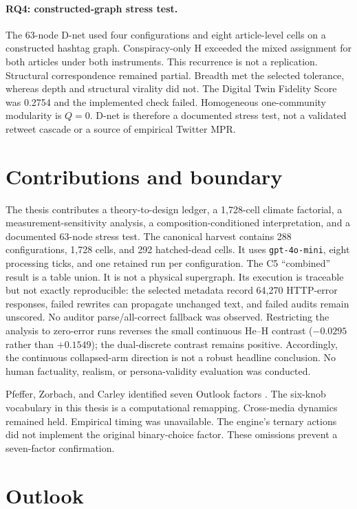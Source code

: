 \paragraph{RQ4: constructed-graph stress test.}
The 63-node D-net used four configurations and eight article-level cells on a
constructed hashtag graph. Conspiracy-only H exceeded the mixed assignment for
both articles under both instruments. This recurrence is not a replication.
Structural correspondence remained partial. Breadth met the selected
tolerance, whereas depth and structural virality did not. The Digital Twin
Fidelity Score was 0.2754 and the implemented check failed. Homogeneous
one-community modularity is \(Q=0\). D-net is therefore a documented stress
test, not a validated retweet cascade or a source of empirical Twitter MPR.

\section{Contributions and boundary}

The thesis contributes a theory-to-design ledger, a 1,728-cell climate
factorial, a measurement-sensitivity analysis, a composition-conditioned
interpretation, and a documented 63-node stress test. The canonical harvest
contains 288 configurations, 1,728 cells, and 292 hatched-dead cells. It uses
\texttt{gpt-4o-mini}, eight processing ticks, and one retained run per
configuration. The C5 ``combined'' result is a table union. It is not a
physical supergraph. Its execution is traceable but not exactly reproducible:
the selected metadata record 64,270 HTTP-error responses, failed rewrites can
propagate unchanged text, and failed audits remain unscored. No auditor
parse/all-correct fallback was observed. Restricting the analysis to
zero-error runs reverses the small continuous He--H contrast (\(-0.0295\)
rather than \(+0.1549\)); the dual-discrete contrast remains positive.
Accordingly, the continuous collapsed-arm direction is not a robust headline
conclusion. No human factuality, realism, or persona-validity evaluation was
conducted.

Pfeffer, Zorbach, and Carley identified seven Outlook factors
\parencite{pfeffer2014firestorms}. The six-knob vocabulary in this thesis is a
computational remapping. Cross-media dynamics remained held. Empirical timing
was unavailable. The engine's ternary actions did not implement the original
binary-choice factor. These omissions prevent a seven-factor confirmation.

\section{Outlook}

